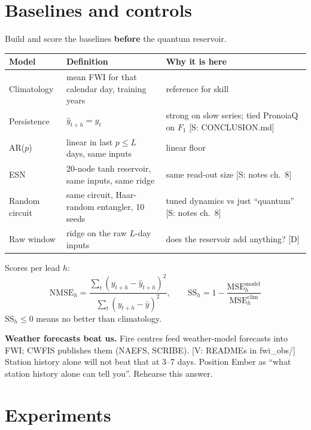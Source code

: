 \documentclass[11pt,a4paper]{article}
\newcommand{\tagbox}[2]{{\footnotesize\color{#1}\textsf{[#2]}}}
\newcommand{\supp}[1]{\tagbox{ForestGreen!70!black}{S: #1}}  %
\newcommand{\veri}[1]{\tagbox{ForestGreen!70!black}{V: #1}}  %
\newcommand{\ours}{\tagbox{NavyBlue}{D}}                      %
\begin{document}
\section{Baselines and controls}

\begin{teamrule}
Build and score the baselines \textbf{before} the quantum reservoir.
\end{teamrule}

\begin{center}\small
\begin{tabularx}{\linewidth}{@{}l Y Y@{}}
\toprule
\textbf{Model} & \textbf{Definition} & \textbf{Why it is here}\\
\midrule
Climatology & mean FWI for that calendar day, training years & reference for skill\\
Persistence & $\hat y_{t+h}=y_t$ & strong on slow series; tied PronoiaQ on $F_1$ \supp{CONCLUSION.md}\\
AR($p$) & linear in last $p\le L$ days, same inputs & linear floor\\
ESN & 20-node tanh reservoir, same inputs, same ridge & same read-out size \supp{notes ch.~8}\\
Random circuit & same circuit, Haar-random entangler, 10 seeds & tuned dynamics vs just ``quantum'' \supp{notes ch.~8}\\
Raw window & ridge on the raw $L$-day inputs & does the reservoir add anything? \ours\\
\bottomrule
\end{tabularx}
\end{center}

Scores per lead $h$:
\[
\mathrm{NMSE}_h=\frac{\sum_t(y_{t+h}-\hat y_{t+h})^2}{\sum_t(y_{t+h}-\bar y)^2},
\qquad
\mathrm{SS}_h=1-\frac{\mathrm{MSE}_h^{\text{model}}}{\mathrm{MSE}_h^{\text{clim}}}
\]
$\mathrm{SS}_h\le0$ means no better than climatology.

\begin{watch}
\textbf{Weather forecasts beat us.} Fire centres feed weather-model forecasts into FWI; CWFIS publishes them (NAEFS,
SCRIBE). \veri{READMEs in fwi\_obs/} Station history alone will not beat that at 3--7 days.
Position Ember as ``what station history alone can tell you''. Rehearse this answer.
\end{watch}

\section{Experiments}
\end{document}
